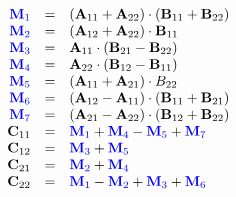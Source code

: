     \vspace{-50pt}
    \begin{multicols}{2}
        \begin{equation*}
            \begin{array}{rcl}
                \color{blue} \mathbf{M}_1 & = & (\mathbf{A}_{11} + \mathbf{A}_{22})\cdot (\mathbf{B}_{11} + \mathbf{B}_{22}) \\
                \color{blue} \mathbf{M}_2 & = & (\mathbf{A}_{12} + \mathbf{A}_{22})\cdot \mathbf{B}_{11} \\
                \color{blue} \mathbf{M}_3 & = & \mathbf{A}_{11}\cdot (\mathbf{B}_{21} - \mathbf{B}_{22}) \\
                \color{blue} \mathbf{M}_4 & = & \mathbf{A}_{22}\cdot (\mathbf{B}_{12} - \mathbf{B}_{11}) \\
                \color{blue} \mathbf{M}_5 & = & (\mathbf{A}_{11} + \mathbf{A}_{21})\cdot B_{22} \\
                \color{blue} \mathbf{M}_6 & = & (\mathbf{A}_{12} - \mathbf{A}_{11})\cdot (\mathbf{B}_{11} + \mathbf{B}_{21}) \\
                \color{blue} \mathbf{M}_7 & = & (\mathbf{A}_{21} - \mathbf{A}_{22})\cdot (\mathbf{B}_{12} + \mathbf{B}_{22}) \\
                \mathbf{C}_{11} & = & \color{blue} \mathbf{M}_1 \color{black} + \color{blue} \mathbf{M}_4 \color{black} - \color{blue} \mathbf{M}_5 \color{black} + \color{blue} \mathbf{M}_7 \\
                \mathbf{C}_{12} & = & \color{blue} \mathbf{M}_3 \color{black} + \color{blue} \mathbf{M}_5 \\
                \mathbf{C}_{21} & = & \color{blue} \mathbf{M}_2 \color{black} + \color{blue} \mathbf{M}_4 \\
                \mathbf{C}_{22} & = & \color{blue} \mathbf{M}_1 \color{black} - \color{blue} \mathbf{M}_2 \color{black} + \color{blue} \mathbf{M}_3 \color{black} + \color{blue} \mathbf{M}_6
            \end{array}
        \end{equation*}

        \columnbreak


\end{multicols}
